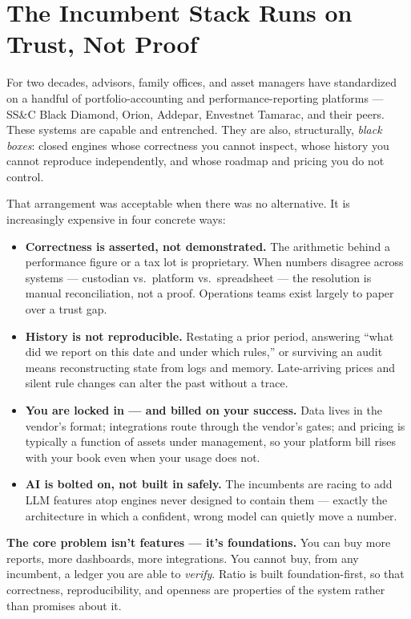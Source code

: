 \section{The Incumbent Stack Runs on Trust, Not Proof}

For two decades, advisors, family offices, and asset managers have standardized
on a handful of portfolio-accounting and performance-reporting platforms ---
SS\&C Black Diamond, Orion, Addepar, Envestnet Tamarac, and their peers. These
systems are capable and entrenched. They are also, structurally, \emph{black
boxes}: closed engines whose correctness you cannot inspect, whose history you
cannot reproduce independently, and whose roadmap and pricing you do not control.

That arrangement was acceptable when there was no alternative. It is increasingly
expensive in four concrete ways:

\begin{itemize}
  \item \textbf{Correctness is asserted, not demonstrated.} The arithmetic behind
  a performance figure or a tax lot is proprietary. When numbers disagree across
  systems --- custodian vs.\ platform vs.\ spreadsheet --- the resolution is
  manual reconciliation, not a proof. Operations teams exist largely to paper
  over a trust gap.
  \item \textbf{History is not reproducible.} Restating a prior period, answering
  ``what did we report on this date and under which rules,'' or surviving an audit
  means reconstructing state from logs and memory. Late-arriving prices and silent
  rule changes can alter the past without a trace.
  \item \textbf{You are locked in --- and billed on your success.} Data lives in
  the vendor's format; integrations route through the vendor's gates; and pricing
  is typically a function of assets under management, so your platform bill rises
  with your book even when your usage does not.
  \item \textbf{AI is bolted on, not built in safely.} The incumbents are racing
  to add LLM features atop engines never designed to contain them --- exactly the
  architecture in which a confident, wrong model can quietly move a number.
\end{itemize}

\begin{callout}
\sffamily\color{ratioInk}
\textbf{The core problem isn't features --- it's foundations.} You can buy more
reports, more dashboards, more integrations. You cannot buy, from any incumbent,
a ledger you are able to \emph{verify}. Ratio is built foundation-first, so that
correctness, reproducibility, and openness are properties of the system rather
than promises about it.
\end{callout}
